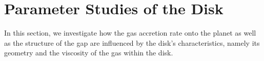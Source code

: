 

  \newpage
  \section{Parameter Studies of the Disk}
  
   In this section, we investigate how the gas accretion rate onto the planet 
   as well as the structure of the gap are influenced by the disk's
   characteristics, namely its geometry and the viscosity of the gas within
   the disk.
 
